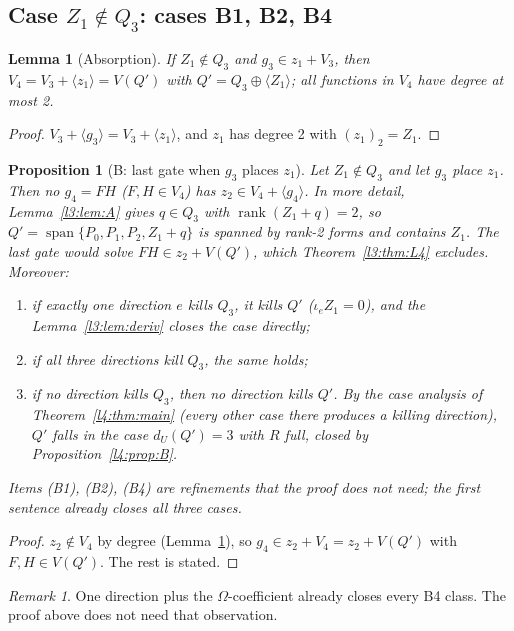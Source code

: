 \documentclass[11pt,a4paper]{article}
\theoremstyle{plain}
\newtheorem{lemma}[theorem]{Lemma}
\newtheorem{proposition}[theorem]{Proposition}
\theoremstyle{remark}
\newtheorem{remark}[theorem]{Remark}
\newcommand{\Span}{\operatorname{span}}
\newcommand{\rk}{\operatorname{rank}}
\newcommand{\dU}{d_U}
\begin{document}
\subsection[Case Z1 outside Q3: cases B1, B2, B4]{Case $Z_1\notin Q_3$: cases B1, B2, B4}

\begin{lemma}[Absorption]\label{l3:lem:abs}
If $Z_1\notin Q_3$ and $g_3\in z_1+V_3$, then $V_4=V_3+\langle z_1\rangle=V(Q')$ with $Q'=Q_3\oplus\langle Z_1\rangle$; all functions in $V_4$ have degree at most 2.
\end{lemma}

\begin{proof}
$V_3+\langle g_3\rangle=V_3+\langle z_1\rangle$, and $z_1$ has degree 2 with $(z_1)_2=Z_1$.
\end{proof}

\begin{proposition}[B: last gate when $g_3$ places $z_1$]\label{l3:prop:B}
Let $Z_1\notin Q_3$ and let $g_3$ place $z_1$. Then no $g_4=FH$ ($F,H\in V_4$) has $z_2\in V_4+\langle g_4\rangle$. In more detail, Lemma~\ref{l3:lem:A} gives $q\in Q_3$ with $\rk(Z_1+q)=2$, so $Q'=\Span\{P_0,P_1,P_2,Z_1+q\}$ is spanned by rank-2 forms and contains $Z_1$. The last gate would solve $FH\in z_2+V(Q')$, which Theorem~\ref{l3:thm:L4} excludes. Moreover:
\begin{enumerate}[(B1)]
\item if exactly one direction $e$ kills $Q_3$, it kills $Q'$ ($\iota_eZ_1=0$), and the Lemma~\ref{l3:lem:deriv} closes the case directly;
\item if all three directions kill $Q_3$, the same holds;
\item[(B4)] if no direction kills $Q_3$, then no direction kills $Q'$. By the case analysis of Theorem~\ref{l4:thm:main} (every other case there produces a killing direction), $Q'$ falls in the case $\dU(Q')=3$ with $R$ full, closed by Proposition~\ref{l4:prop:B}.
\end{enumerate}
Items (B1), (B2), (B4) are refinements that the proof does not need; the first sentence already closes all three cases.
\end{proposition}

\begin{proof}
$z_2\notin V_4$ by degree (Lemma~\ref{l3:lem:abs}), so $g_4\in z_2+V_4=z_2+V(Q')$ with $F,H\in V(Q')$. The rest is stated.
\end{proof}

\begin{remark}\label{l3:rem:one-direction}
One direction plus the $\Omega$-coefficient already closes every B4 class. The proof above does not need that observation.
\end{remark}
\end{document}
